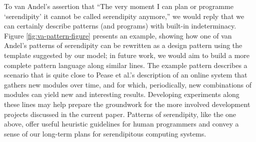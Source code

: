 
To van Andel's assertion that ``The very moment I can plan or
programme `serendipity' it cannot be called serendipity anymore,'' we
would reply that we can certainly describe patterns (and programs)
with built-in indeterminacy.  Figure \ref{fig:va-pattern-figure}
presents an example, showing how one of van Andel's patterns of
serendipity can be rewritten as a design pattern using the template
suggested by our model; in future work, we would aim to build a more
complete pattern language along similar lines.
%
The example pattern describes a scenario that is quite close to Pease et al.'s \citeyear{pease2013discussion} description of an online
system that gathers new modules over time, and for which,
periodically, new combinations of modules can yield new and
interesting results.
%
Developing experiments along these lines may help prepare the
groundwork for the more involved development projects discussed in the
current paper.
%
Patterns of serendipity, like the one above, offer useful heuristic
guidelines for human programmers and convey a sense of our long-term
plans for serendipitous computing systems.





